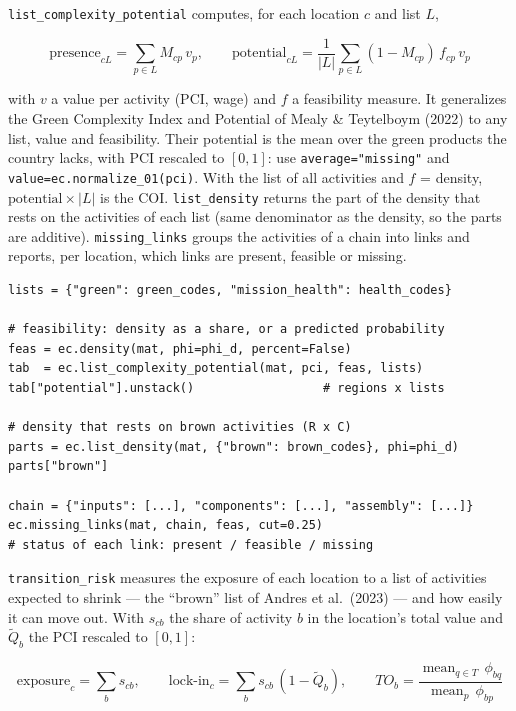 \documentclass[12pt, a4paper]{article}
\newcommand{\fn}[1]{\texttt{#1}}
\begin{document}
\fn{list\_complexity\_potential} computes, for each location $c$ and
list $L$,

\[
  \text{presence}_{cL} = \sum_{p \in L} M_{cp}\,v_p, \qquad
  \text{potential}_{cL} = \frac{1}{|L|} \sum_{p \in L} (1 - M_{cp})\,f_{cp}\,v_p
\]

\begin{sloppypar}
with $v$ a value per activity (PCI, wage) and $f$ a feasibility measure.
It generalizes the Green Complexity Index and Potential of Mealy \&
Teytelboym (2022) to any list, value and feasibility. Their potential is
the mean over the green products the country lacks, with PCI rescaled to
$[0,1]$: use \texttt{average="missing"} and
\texttt{value=ec.normalize\_01(pci)}. With the list of all activities
and $f$ = density, $\text{potential} \times |L|$ is the COI. \fn{list\_density} returns the part of the density that rests on the
activities of each list (same denominator as the density, so the parts
are additive). \fn{missing\_links} groups the activities of a chain into
links and reports, per location, which links are present, feasible or
missing.
\end{sloppypar}

\begin{lstlisting}[caption={Indicators for lists of activities}]
lists = {"green": green_codes, "mission_health": health_codes}

# feasibility: density as a share, or a predicted probability
feas = ec.density(mat, phi=phi_d, percent=False)
tab  = ec.list_complexity_potential(mat, pci, feas, lists)
tab["potential"].unstack()                  # regions x lists

# density that rests on brown activities (R x C)
parts = ec.list_density(mat, {"brown": brown_codes}, phi=phi_d)
parts["brown"]

chain = {"inputs": [...], "components": [...], "assembly": [...]}
ec.missing_links(mat, chain, feas, cut=0.25)
# status of each link: present / feasible / missing
\end{lstlisting}

\begin{sloppypar}
\fn{transition\_risk} measures the exposure of each location to a list
of activities expected to shrink --- the ``brown'' list of Andres et
al.\ (2023) --- and how easily it can move out. With $s_{cb}$ the share
of activity $b$ in the location's total value and $\widetilde{Q}_b$ the
PCI rescaled to $[0,1]$:
\end{sloppypar}

\[
  \text{exposure}_c = \sum_{b} s_{cb}, \qquad
  \text{lock-in}_c = \sum_{b} s_{cb}\,(1 - \widetilde{Q}_b), \qquad
  TO_b = \frac{\operatorname{mean}_{q \in T}\,\phi_{bq}}
              {\operatorname{mean}_{p}\,\phi_{bp}}
\]
\end{document}
